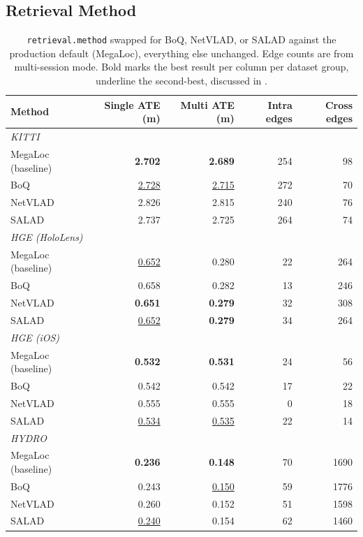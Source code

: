 \clearpage
\subsection{Retrieval Method}
\label{sec:appendix-ablation-retrieval}

\begin{table}[htb]
  \centering
  \footnotesize
  \begin{tabular*}{\textwidth}{@{\extracolsep{\fill}} lrrrr}
  \hline
  \textbf{Method} & \textbf{Single ATE (m)} & \textbf{Multi ATE (m)} & \textbf{Intra edges} & \textbf{Cross edges} \\
  \hline
  \multicolumn{5}{l}{\textit{KITTI}} \\
  MegaLoc (baseline) & \textbf{2.702} & \textbf{2.689} & 254 & 98 \\
  BoQ & \underline{2.728} & \underline{2.715} & 272 & 70 \\
  NetVLAD & 2.826 & 2.815 & 240 & 76 \\
  SALAD & 2.737 & 2.725 & 264 & 74 \\
  \hline
  \multicolumn{5}{l}{\textit{HGE (HoloLens)}} \\
  MegaLoc (baseline) & \underline{0.652} & 0.280 & 22 & 264 \\
  BoQ & 0.658 & 0.282 & 13 & 246 \\
  NetVLAD & \textbf{0.651} & \textbf{0.279} & 32 & 308 \\
  SALAD & \underline{0.652} & \textbf{0.279} & 34 & 264 \\
  \hline
  \multicolumn{5}{l}{\textit{HGE (iOS)}} \\
  MegaLoc (baseline) & \textbf{0.532} & \textbf{0.531} & 24 & 56 \\
  BoQ & 0.542 & 0.542 & 17 & 22 \\
  NetVLAD & 0.555 & 0.555 & 0 & 18 \\
  SALAD & \underline{0.534} & \underline{0.535} & 22 & 14 \\
  \hline
  \multicolumn{5}{l}{\textit{HYDRO}} \\
  MegaLoc (baseline) & \textbf{0.236} & \textbf{0.148} & 70 & 1690 \\
  BoQ & 0.243 & \underline{0.150} & 59 & 1776 \\
  NetVLAD & 0.260 & 0.152 & 51 & 1598 \\
  SALAD & \underline{0.240} & 0.154 & 62 & 1460 \\
  \hline
  \end{tabular*}
  \caption[Retrieval-method ATE and edge counts, by dataset]{\texttt{retrieval.method} swapped for
    BoQ, NetVLAD, or SALAD against the production default (MegaLoc), everything else unchanged.
    Edge counts are from multi-session mode. Bold marks the best result per column per dataset
    group, underline the second-best, discussed in .}
  \label{tab:ablation-retrieval}
\end{table}